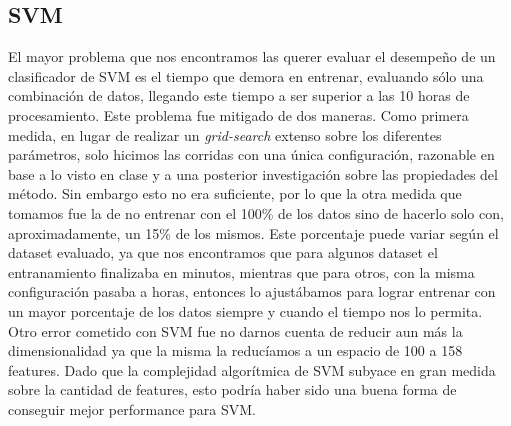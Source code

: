\subsection*{SVM}
El mayor problema que nos encontramos las querer evaluar el desempeño de un clasificador de SVM es el tiempo que demora en entrenar, evaluando sólo una combinación de datos, llegando este tiempo a ser superior a las 10 horas de procesamiento. Este problema fue mitigado de dos maneras. Como primera medida, en lugar de realizar un \textit{grid-search} extenso sobre los diferentes parámetros, solo hicimos las corridas con una única configuración, razonable en base a lo visto en clase y a una posterior investigación sobre las propiedades del método. Sin embargo esto no era suficiente, por lo que la otra medida que tomamos fue la de no entrenar con el 100\% de los datos sino de hacerlo solo con, aproximadamente, un 15\%  de los mismos. Este porcentaje puede variar según el dataset evaluado, ya que nos encontramos que para algunos dataset el entranamiento finalizaba en minutos, mientras que para otros, con la misma configuración pasaba a horas, entonces lo ajustábamos para lograr entrenar con un mayor porcentaje de los datos siempre y cuando el tiempo nos lo permita. 
Otro error cometido con SVM fue no darnos cuenta de reducir aun más la dimensionalidad ya que la misma la reducíamos a un espacio de 100 a 158 features. Dado que la complejidad algorítmica de SVM subyace en gran medida sobre la cantidad de features, esto podría haber sido una buena forma de conseguir mejor performance para SVM.

